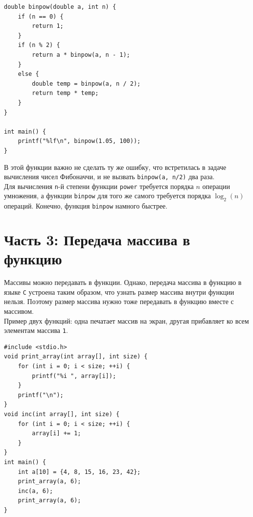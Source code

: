 \documentclass{article}
\begin{document}
\begin{itemize}
\begin{lstlisting}[backgroundcolor = \color{solcolor}]
double binpow(double a, int n) {
    if (n == 0) {
        return 1;
    }
    if (n % 2) {
        return a * binpow(a, n - 1);
    }
    else {
        double temp = binpow(a, n / 2);
        return temp * temp;
    }
}

int main() {
    printf("%lf\n", binpow(1.05, 100));
}
\end{lstlisting}
В этой функции важно не сделать ту же ошибку, что встретилась в задаче вычисления чисел Фибоначчи, и не вызвать \texttt{binpow(a, n/2)} два раза.\\

Для вычисления \texttt{n}-й степени функции \texttt{power} требуется порядка $n$ операции умножения, а функции \texttt{binpow} для того же самого требуется порядка $\log_2(n)$ операций. Конечно, функция \texttt{binpow} намного быстрее.
\end{itemize}




\newpage
\section*{Часть 3: Передача массива в функцию}
Массивы можно передавать в функции. Однако, передача массива в функцию в языке \texttt{C} устроена таким образом, что узнать размер массива внутри функции нельзя. Поэтому размер массива нужно тоже передавать в функцию вместе с массивом.\\

Пример двух функций: одна печатает массив на экран, другая прибавляет ко всем элементам массива \texttt{1}.
\begin{lstlisting}
#include <stdio.h>
void print_array(int array[], int size) {
    for (int i = 0; i < size; ++i) {
        printf("%i ", array[i]);
    }
    printf("\n");
}
void inc(int array[], int size) {
    for (int i = 0; i < size; ++i) {
        array[i] += 1;
    }
}
int main() {
    int a[10] = {4, 8, 15, 16, 23, 42};
    print_array(a, 6);
    inc(a, 6);
    print_array(a, 6);
}
\end{lstlisting}
\end{document}
